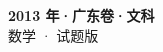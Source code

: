 \documentclass[zihao=-4, a4paper]{ctexart}
\begin{document}
\begin{center}
  {\Large\bfseries 2013 年·广东卷·文科}\\[4pt]
  {\large 数学 · 试题版}
\end{center}
\medskip
{}

\end{document}
